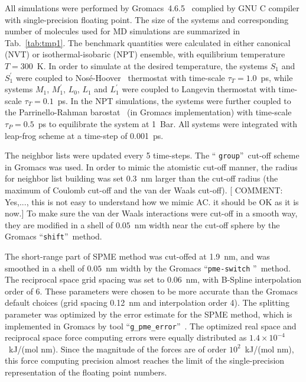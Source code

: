 \documentclass[a4paper,preprint,unsortedaddress,onecolumn,fleqn]{revtex4}
\newcommand{\recheck}[1]{{\color{red} #1}}
\begin{document}
All simulations were performed by Gromacs~4.6.5~\cite{hess2008gromacs,
pronk2013gromacs} complied by GNU C compiler with single-precision floating
point. The size of the systems and corresponding number of molecules used
for MD simulations are summarized in Tab.~\ref{tab:tmp1}. The benchmark
quantities were calculated in either canonical (NVT) or isothermal-isobaric
(NPT) ensemble, with equilibrium temperature $T=300$~K. In order to simulate
at the desired temperature, the systems $S_{1}$ and $S_{1}^{\prime }$ were
coupled to Nos\'{e}-Hoover~\cite{nose1984molecular,hoover1985canonical}
thermostat with time-scale $\tau _{T}=1.0$~ps, while systems $M_{1}$, $%
M_{1}^{\prime }$, $L_{0}$, $L_{1}$ and $L_{1}^{\prime }$ were coupled to
Langevin thermostat with time-scale $\tau _{T}=0.1$~ps. In the NPT
simulations, the systems were further coupled to the Parrinello-Rahman
barostat~\cite{parrinello1980crystal,parrinello1981polymorphic} (in Gromacs
implementation) with time-scale $\tau _{P}=0.5$~ps to equilibrate the system
at 1~Bar. All systems were integrated with leap-frog scheme at a time-step
of 0.001~ps.

The neighbor lists were updated every 5 time-steps. The \textquotedblleft 
\texttt{group}\textquotedblright\ cut-off scheme in Gromacs was used. In
order to mimic the atomistic cut-off manner, the radius for neighbor list
building was set 0.3~nm larger than the cut-off radius (the maximum of
Coulomb cut-off and the van der Waals cut-off). [ {\color{blue} COMMENT:
Yes,..., this is not easy to understand how we mimic AC. \recheck{it should be OK as it is now.}}] To make sure the
van der Waals interactions were cut-off in a smooth way, they are modified
in a shell of $0.05$~nm width near the cut-off sphere by the Gromacs
\textquotedblleft \texttt{shift}\textquotedblright\ method.

The short-range part of SPME method \recheck{was cut-offed at 1.9~nm, and was} smoothed in a shell of $0.05$~nm
width by the Gromacs \textquotedblleft \texttt{pme-switch}%
\textquotedblright\ method. The reciprocal space grid spacing was set to
0.06~nm, with B-Spline interpolation order of 6. These parameters were
chosen to be more accurate than the Gromacs default choices (grid spacing
0.12~nm and interpolation order 4). The splitting parameter was optimized by
the error estimate for the SPME method, which is implemented in Gromacs by
tool \textquotedblleft \texttt{g\_pme\_error}\textquotedblright ~\cite%
{wang2010optimizing}. The optimized real space and reciprocal space force
computing errors were equally distributed as $1.4\times 10^{-4}$~kJ/(mol
nm). Since the magnitude of the forces are of order $10^{2}$~kJ/(mol nm),
this force computing precision almost reaches the limit of the
single-precision representation of the floating point numbers.
\end{document}
